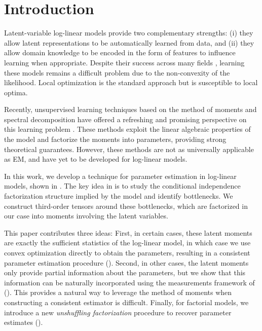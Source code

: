 \section{Introduction} \label{sec:introduction}

Latent-variable log-linear models provide two complementary strengths: (i) they allow
latent representations to be automatically learned from data, and (ii)
they allow domain knowledge to be encoded in the form of features to influence learning when appropriate.
Despite their success across many fields \cite{quattoni04crf,haghighi06prototype,liang06discrimative,kirkpatrick10painless,deselaers12latent},
learning these models remains a difficult problem due to the non-convexity of the likelihood.
Local optimization is the standard approach but is susceptible to local optima.

Recently, unsupervised learning techniques based on the method of moments and
spectral decomposition have offered a refreshing and promising perspective on
this learning problem \citep{hsu09spectral,anandkumar11tree,anandkumar12moments,anandkumar12lda,hsu12identifiability,balle11transducer,balle12automata}.
These methods exploit the linear algebraic properties of the model and
factorize the moments into parameters, providing strong theoretical guarantees.
However, these methods are not as universally applicable as EM, and have yet to
be developed for log-linear models.


In this work, we develop a technique for parameter estimation in log-linear
models, shown in .  The key idea in
\citet{anandkumar12moments,anandkumar13tensor} is to study the conditional
independence factorization structure implied by the model and identify
bottlenecks.  We construct third-order tensors around these bottlenecks, which
are factorized in our case into moments involving the latent variables.

This paper contributes three ideas:
First, in certain cases, these latent moments are exactly the sufficient statistics of
the log-linear model, in which case we use convex optimization directly to obtain the parameters,
resulting in a consistent parameter estimation procedure ().
Second, in other cases, the latent moments only provide partial information about the parameters,
but we show that this information can be naturally incorporated
using the measurements framework of \citet{liang09measurements} ().
This provides a natural way to leverage the method of moments when constructing
a consistent estimator is difficult.
Finally, for factorial models, we introduce a new \emph{unshuffling
factorization} procedure to recover parameter estimates ().
